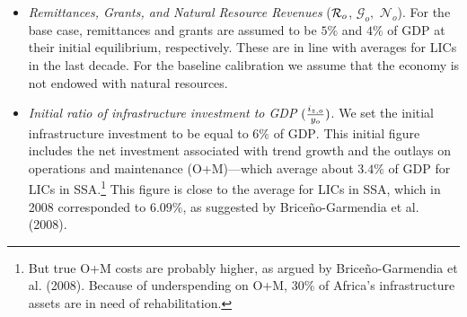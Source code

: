 \documentclass[11pt]{article}
\begin{document}
\begin{itemize}
\item \textit{Remittances, Grants, and Natural Resource Revenues} ($\mathcal{%
R}_{o}$, $\mathcal{G}_{o},$ $\mathcal{N}_{o}$). For the base case,
remittances and grants are assumed to be $5\%$ and $4\%$ of GDP at their
initial equilibrium, respectively. These are in line with averages for LICs
in the last decade. For the baseline calibration we assume that the economy
is not endowed with natural resources.

\item \textit{Initial ratio of infrastructure investment to GDP }$(\frac{%
i_{z,o}}{y_{o}})$. We set the initial infrastructure investment to be equal
to $6\%$ of GDP$.$ This initial figure includes the net investment
associated with trend growth and the outlays on operations and maintenance
(O+M)---which average about $3.4\%$ of GDP for LICs in SSA.\footnote{%
But true O+M costs are probably higher, as argued by Brice\~{n}o-Garmendia
et al. (2008). Because of underspending on O+M, 30\% of Africa's
infrastructure assets are in need of rehabilitation.} This figure is close
to the average for LICs in SSA, which in 2008 corresponded to $6.09\%$, as
suggested by Brice\~{n}o-Garmendia et al. (2008).


\end{itemize}
\end{document}
